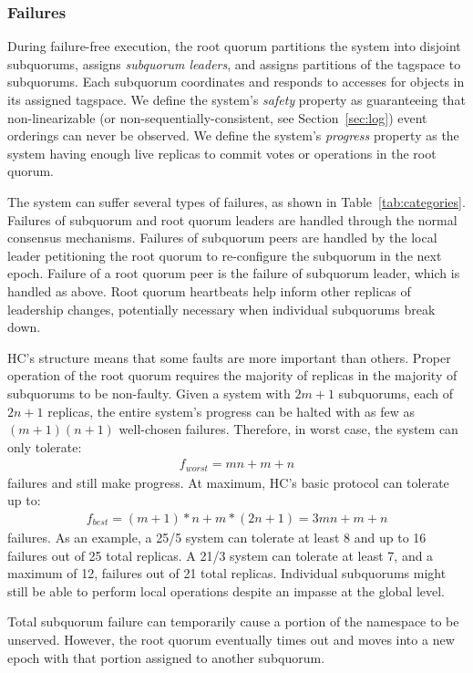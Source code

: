 \documentclass[letterpaper,10pt,twocolumn]{article}
\newcommand{\sub}{subquorum\xspace}
\newcommand{\subs}{subquorums\xspace}
\newcommand{\roo}{root quorum\xspace}
\newcommand{\Roo}{Root quorum\xspace}
\begin{document}
\subsubsection{Failures}
\label{sec:fault-tolerance}

During failure-free execution, the \roo partitions the system into
disjoint \subs, assigns \emph{\sub leaders}, and assigns partitions
of the tagspace to \subs.
Each \sub coordinates and responds to accesses for objects in its assigned
tagspace.
We define the system's \emph{safety} property as guaranteeing that
non-linearizable (or non-sequentially-consistent, see Section~\ref{sec:log})
event orderings can never be observed.
We define the system's \emph{progress} property as the system having enough
live replicas to commit votes or operations in the \roo.

The system can suffer several types of failures, as shown in
Table~\ref{tab:categories}.
Failures of \sub and \roo leaders are handled through the normal consensus
mechanisms.
Failures of \sub peers are handled by the local leader petitioning the \roo to
re-configure the \sub in the next epoch.
Failure of a \roo peer is the failure of \sub leader, which is handled as
above.
\Roo heartbeats help inform other replicas of leadership changes, potentially
necessary when individual \subs break down.

HC's structure means that some faults are more important than others.
Proper operation of the \roo requires the majority of replicas in the majority of \subs to
be non-faulty.
Given a system with $2m+1$ \subs, each of $2n+1$ replicas, the entire
system's progress can be halted with as few as $(m+1)(n+1)$ well-chosen
failures.
Therefore, in worst case, the system can only tolerate:
\begin{align*}
f_{worst}=mn+m+n
\end{align*}
failures and still make progress.
At maximum, HC's basic protocol can tolerate up to:
\begin{align*}
f_{best} = (m+1)*n + m*(2n+1) = 3mn+m+n
\end{align*}
failures.
As an example, a 25/5 system can tolerate at least 8 and
up to 16 failures out of 25 total replicas.
A 21/3 system can tolerate at least 7, and a maximum of 12,
failures out of 21 total replicas.
Individual \subs might
still be able to perform local operations despite an impasse at the global level.

Total \sub failure can temporarily cause a portion of the namespace to be unserved. However, the \roo
eventually times out and moves into a new epoch with that portion assigned to another
\sub.
\end{document}
